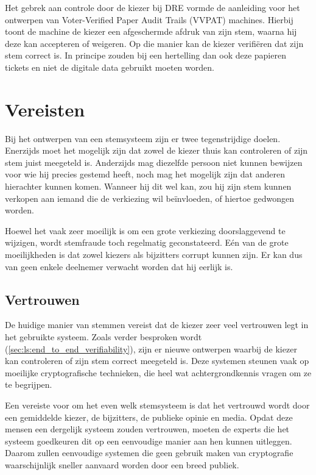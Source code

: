 \npar Het gebrek aan controle door de kiezer bij DRE vormde de aanleiding voor het ontwerpen van Voter-Verified Paper Audit Trails (VVPAT) machines. Hierbij toont de machine de kiezer een afgeschermde afdruk van zijn stem, waarna hij deze kan accepteren of weigeren. Op die manier kan de kiezer verifi\"eren dat zijn stem correct is. In principe zouden bij een hertelling dan ook deze papieren tickets en niet de digitale data gebruikt moeten worden.\cite{wiki:vvpat}

\section{Vereisten}

Bij het ontwerpen van een stemsysteem zijn er twee tegenstrijdige doelen. Enerzijds moet het mogelijk zijn dat zowel de kiezer thuis kan controleren of zijn stem juist meegeteld is. Anderzijds mag diezelfde persoon niet kunnen bewijzen voor wie hij precies gestemd heeft, noch mag het mogelijk zijn dat anderen hierachter kunnen komen. Wanneer hij dit wel kan, zou hij zijn stem kunnen verkopen aan iemand die de verkiezing wil beïnvloeden, of hiertoe gedwongen worden.

\npar Hoewel het vaak zeer moeilijk is om een grote verkiezing doorslaggevend te wijzigen, wordt stemfraude toch regelmatig geconstateerd.\cite{adida_advances_in_cryptographic_voting_systems} E\'en van de grote moeilijkheden is dat zowel kiezers als bijzitters corrupt kunnen zijn. Er kan dus van geen enkele deelnemer verwacht worden dat hij eerlijk is.

\subsection{Vertrouwen}
\label{sec:ls:vertrouwen}

De huidige manier van stemmen vereist dat de kiezer zeer veel vertrouwen legt in het gebruikte systeem. Zoals verder besproken wordt (\ref{sec:ls:end_to_end_verifiability}), zijn er nieuwe ontwerpen waarbij de kiezer kan controleren of zijn stem correct meegeteld is. Deze systemen steunen vaak op moeilijke cryptografische technieken, die heel wat achtergrondkennis vragen om ze te begrijpen.

\npar Een vereiste voor om het even welk stemsysteem is dat het vertrouwd wordt door een gemiddelde kiezer, de bijzitters, de publieke opinie en media. Opdat deze mensen een dergelijk systeem zouden vertrouwen, moeten de experts die het systeem goedkeuren dit op een eenvoudige manier aan hen kunnen uitleggen.\cite{randell_ryan_voting_technologies_and_trust} Daarom zullen eenvoudige systemen die geen gebruik maken van cryptografie waarschijnlijk sneller aanvaard worden door een breed publiek.

